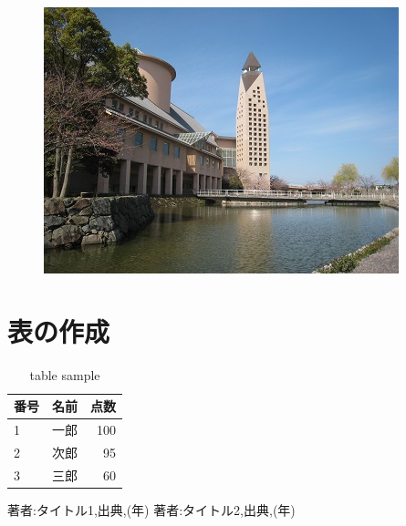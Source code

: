 \documentclass[uplatex,11pt,a4j]{jsarticle}
\begin{document}
\begin{figure}[htbp]
\begin{minipage}{0.3\hsize}
    \includegraphics[width=\hsize]{./figures/kendai_a22.jpg}
  \end{minipage}
\end{figure}

\section{表の作成}
\begin{table}[htbp]
  \caption{table sample}
  \label{tb:sample}
  \centering
  \begin{tabular}{lcr}
    \hline
    番号 & 名前 & 点数 \\
    \hline \hline
    1 & 一郎 & 100 \\
    2 & 次郎 & 95 \\
    3 & 三郎 & 60 \\
    \hline
  \end{tabular}
\end{table}



\begin{thebibliography}{99}
   著者:タイトル1,出典,(年)
   著者:タイトル2,出典,(年)
\end{thebibliography}
\end{document}
